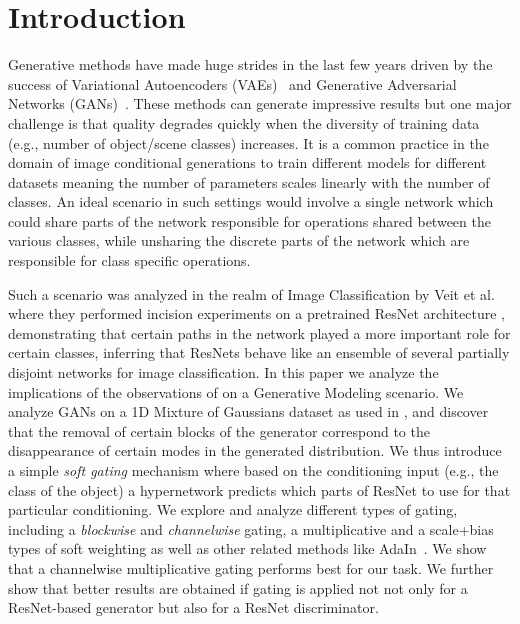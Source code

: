 \section{Introduction}
Generative methods have made huge strides in the last few years driven by the success of Variational Autoencoders (VAEs)~\cite{kingma2013auto} and Generative Adversarial Networks (GANs)~\cite{goodfellow2014generative}. 
These methods can generate impressive results but one major challenge is that quality degrades quickly when the diversity of training data (e.g., number of object/scene classes) increases. 
It is a common practice in the domain of image conditional generations to train different models for different datasets \cite{goodfellow2014generative,isola2016image2image,karras2017progressive,zhu2017toward,zhu2017unpaired,wang2018video} meaning the number of parameters scales linearly with the number of classes. 
An ideal scenario in such settings would involve a single network which could share parts of the network responsible for operations shared between the various classes, while unsharing the discrete parts of the network which are responsible for class specific operations.

Such a scenario was analyzed in the realm of Image Classification by Veit et al.~\cite{veit2016residual} where they performed incision experiments on a pretrained ResNet architecture \cite{he2016deep}, demonstrating that certain paths in the network played a more important role for certain classes, inferring that ResNets behave like an ensemble of several partially disjoint networks for image classification. 
In this paper we analyze the implications of the observations of \cite{veit2016residual} on a Generative Modeling scenario. 
We analyze GANs on a 1D Mixture of Gaussians dataset as used in \cite{ghosh2017multi}, and discover that the removal of certain blocks of the generator correspond to the disappearance of certain modes in the generated distribution.
We thus introduce a simple {\em soft gating} mechanism where based on the conditioning input (e.g., the class of the object) a hypernetwork predicts which parts of ResNet to use for that particular conditioning.
We explore and analyze different types of gating, including a {\em blockwise} and {\em channelwise} gating, a multiplicative and a scale+bias types of soft weighting as well as other related methods like AdaIn~\cite{huang2017arbitrary,huang2018multimodal}. We show that a channelwise multiplicative gating performs best for our task. We further show that better results are obtained if gating is applied not not only for a ResNet-based generator but also for a ResNet discriminator.


